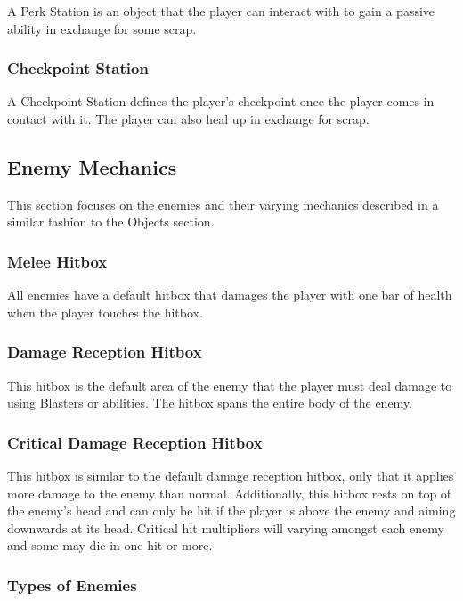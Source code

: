 \documentclass[12pt]{article}
\begin{document}
A Perk Station is an object that the player can interact with to gain a passive ability in exchange for some scrap. 

\subsubsection{Checkpoint Station}

A Checkpoint Station defines the player's checkpoint once the player comes in contact with it. The player can also heal up in exchange for scrap. 

\subsection{Enemy Mechanics}

This section focuses on the enemies and their varying mechanics described in a similar fashion to the Objects section. 

\subsubsection{Melee Hitbox}

All enemies have a default hitbox that damages the player with one bar of health when the player touches the hitbox. 

\subsubsection{Damage Reception Hitbox}

This hitbox is the default area of the enemy that the player must deal damage to using Blasters or abilities. The hitbox spans the entire body of the enemy.

\subsubsection{Critical Damage Reception Hitbox}

This hitbox is similar to the default damage reception hitbox, only that it applies more damage to the enemy than normal. Additionally, this hitbox rests on top of the enemy's head and can only be hit if the player is above the enemy and aiming downwards at its head. Critical hit multipliers will varying amongst each enemy and some may die in one hit or more. 

\subsubsection{Types of Enemies}
\end{document}
